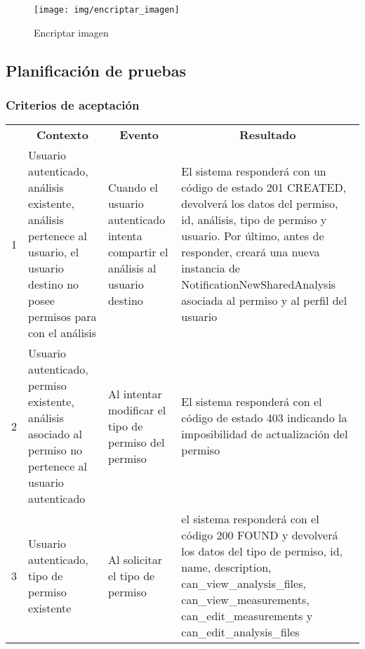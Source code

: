                 \begin{figure}[h]
                	\centering
                	\texttt{[image: img/encriptar\_imagen]}
                	\caption{Encriptar imagen}
                	\label{encriptar_imagen}
                \end{figure}
 
\subsection{Planificación de pruebas}                
\subsubsection{Criterios de aceptación}

\begin{center}
\begin{longtable}{|p{0.5cm}|p{4cm}|p{4cm}|p{4.5cm}| }

	\hline 
		\rowcolor[gray]{0.9} 
		\multicolumn{4}{|c|}{\textbf{Criterio de aceptación}} \\
	\hline
    	\rowcolor[gray]{0.9} 
    	\multicolumn{1}{|c}{\textbf{Id}} & \multicolumn{1}{|c}{\textbf{Contexto}} &  \multicolumn{1}{|c}{\textbf{Evento}} & \multicolumn{1}{|c|}{\textbf{Resultado}} \\
    \hline
    	
1&Usuario autenticado, análisis existente, análisis pertenece al usuario, el usuario destino no posee permisos para con el análisis & Cuando el usuario autenticado intenta compartir el análisis al usuario destino & El sistema responderá con un código de estado 201 CREATED, devolverá los datos del permiso, id, análisis, tipo de permiso y usuario. Por último, antes de responder, creará una nueva instancia de NotificationNewSharedAnalysis asociada al permiso y al perfil del usuario\\  \hline
 
2& Usuario autenticado, permiso existente, análisis asociado al permiso no pertenece al usuario autenticado   & Al intentar modificar el tipo de permiso del permiso & El sistema responderá con el código de estado 403 indicando la imposibilidad de actualización del permiso\\ \hline

3& Usuario autenticado, tipo de permiso existente & Al solicitar el tipo de permiso & el sistema responderá con el código 200 FOUND y devolverá los datos del tipo de permiso, id, name, description, can\_view\_analysis\_files, can\_view\_measurements, can\_edit\_measurements y can\_edit\_analysis\_files\\ \hline


\end{longtable}
\end{center}
